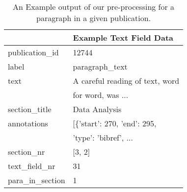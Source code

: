 \begin{table}[h]
    \centering
     \caption{An Example output of our pre-processing for a paragraph in a given publication.}
    \begin{tabular}{ll}
        \toprule
        {}                  &                            Example Text Field Data \\
        \midrule
        publication\_id     &                                              12744 \\
        label               &                                    paragraph\_text \\
        text                &                     A careful reading of text, word\\
                            &                                  for word, was ... \\
        section\_title      &                                      Data Analysis \\
        annotations         &                        [\{'start': 270, 'end': 295,\\
                            &                              'type': 'bibref', ... \\
        section\_nr         &                                             [3, 2] \\
        text\_field\_nr     &                                                 31 \\
        para\_in\_section   &                                                  1 \\
        \bottomrule
    \end{tabular}
    \label{tab:example-paragraph}
\end{table}

